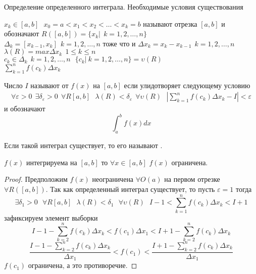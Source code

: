 \begin{title}
  Определение определенного интеграла. Необходимые условия существования
\end{title}

$x_k \in [a,b] ~~~ x_0 = a < x_1 < x_2 < \ldots < x_k = b$ называют
 отрезка $[a,b]$ и обозначают $R([a,b]) =
\{x_k | ~~ k = 1,2,\ldots, n\}$\\
$\Delta_k = [x_{k-1}, x_k] ~~ k = 1,2,\ldots, n$ тоже что и
$\Delta{x_k} = x_k - x_{k-1} ~~ k = 1,2,\ldots, n$\\
$\lambda(R) = max\Delta x_k ~~ 1 \le k \le n$ \\
$c_k \in \Delta_k ~~ k=1,2,\ldots,n ~~~ \{c_k| ~ k=1,2,\ldots,n\} =
\upsilon(R)$ \\
$\sum_{k=1}^{n} f(c_k)\Delta x_k$ \\

\begin{defin}
  Число $I$ называют  от $f(x)$ на $[a,b]$ если
  улидотворяет следующему условию
  \begin{eqnarray*}
    \forall\varepsilon>0 ~~ \exists\delta_{\varepsilon}>0 ~~ \forall R[a,b] ~~~
    \lambda(R)<\delta_{\varepsilon} ~~ \forall\upsilon(R) ~~~
    \left| \sum_{k=1}^{n} f(c_k)\Delta x_k - I \right| < \varepsilon
  \end{eqnarray*}
   и обозначают
  $$\int_{a}^{b} f(x)dx$$

  Если такой интеграл существует, то его называют .
\end{defin}

\begin{block}
  $f(x)$ интегрируема на $[a,b]$ то $\forall x \in [a,b]$ $f(x)$ ограничена.
\end{block}

\begin{proof}
  Предположим $f(x)$ неограничена $\forall O(a)$ на первом
  отрезке $\forall R([a,b])$. Так как определенный интеграл существует,
  то пусть $\varepsilon = 1$ тогда
  \[
  \exists \delta_1 > 0 ~~~ \forall R[a,b] ~~~
  \lambda(R) < \delta_1 ~~~ \forall \upsilon(R) ~~~
   I-1 < \sum_{k=1}^{n} f(c_k)\Delta x_k < I+1
  \] зафиксируем элемент выборки
  $$
  I - 1 - \sum_{k=2}^n f(c_k) \Delta x_k < f(c_1) \Delta x_1 <
  I + 1 - \sum_{k=2}^n f(c_k) \Delta x_k
  $$
  $$
  \frac{I-1 - \sum_{k=2}^n f(c_k) \Delta x_k}{\Delta x_1} <
  f(c_1) < \frac{I+1 - \sum_{k=2}^n f(c_k) \Delta x_k}{\Delta x_1}
  $$
  $f(c_1)$ ограничена, а это противоречие.
\end{proof}

